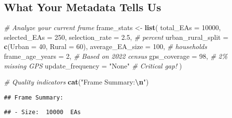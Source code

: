 \documentclass[
]{article}
\newenvironment{Shaded}{\begin{snugshade}}{\end{snugshade}}
\newcommand{\AttributeTok}[1]{\textcolor[rgb]{0.13,0.29,0.53}{#1}}
\newcommand{\CommentTok}[1]{\textcolor[rgb]{0.56,0.35,0.01}{\textit{#1}}}
\newcommand{\DecValTok}[1]{\textcolor[rgb]{0.00,0.00,0.81}{#1}}
\newcommand{\FloatTok}[1]{\textcolor[rgb]{0.00,0.00,0.81}{#1}}
\newcommand{\FunctionTok}[1]{\textcolor[rgb]{0.13,0.29,0.53}{\textbf{#1}}}
\newcommand{\NormalTok}[1]{#1}
\newcommand{\OtherTok}[1]{\textcolor[rgb]{0.56,0.35,0.01}{#1}}
\newcommand{\SpecialCharTok}[1]{\textcolor[rgb]{0.81,0.36,0.00}{\textbf{#1}}}
\newcommand{\StringTok}[1]{\textcolor[rgb]{0.31,0.60,0.02}{#1}}
\begin{document}
\subsection{What Your Metadata Tells
Us}\label{what-your-metadata-tells-us}

\begin{Shaded}
\begin{Highlighting}[]
\CommentTok{\# Analyze your current frame}
\NormalTok{frame\_stats }\OtherTok{\textless{}{-}} \FunctionTok{list}\NormalTok{(}
  \AttributeTok{total\_EAs =} \DecValTok{10000}\NormalTok{,}
  \AttributeTok{selected\_EAs =} \DecValTok{250}\NormalTok{,}
  \AttributeTok{selection\_rate =} \FloatTok{2.5}\NormalTok{,  }\CommentTok{\# percent}
  \AttributeTok{urban\_rural\_split =} \FunctionTok{c}\NormalTok{(}\AttributeTok{Urban =} \DecValTok{40}\NormalTok{, }\AttributeTok{Rural =} \DecValTok{60}\NormalTok{),}
  \AttributeTok{average\_EA\_size =} \DecValTok{100}\NormalTok{,  }\CommentTok{\# households}
  \AttributeTok{frame\_age\_years =} \DecValTok{2}\NormalTok{,  }\CommentTok{\# Based on 2022 census}
  \AttributeTok{gps\_coverage =} \DecValTok{98}\NormalTok{,  }\CommentTok{\# 2\% missing GPS}
  \AttributeTok{update\_frequency =} \StringTok{"None"}  \CommentTok{\# Critical gap!}
\NormalTok{)}

\CommentTok{\# Quality indicators}
\FunctionTok{cat}\NormalTok{(}\StringTok{"Frame Summary:}\SpecialCharTok{\textbackslash{}n}\StringTok{"}\NormalTok{)}
\end{Highlighting}
\end{Shaded}

\begin{verbatim}
## Frame Summary:
\end{verbatim}

\begin{Shaded}
\end{Shaded}

\begin{verbatim}
## - Size:  10000  EAs
\end{verbatim}

\begin{Shaded}
\end{Shaded}
\end{document}
